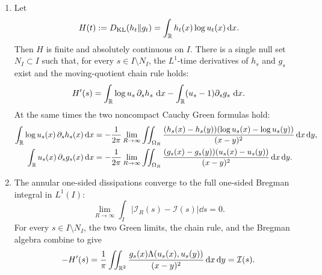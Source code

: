 \begin{proposition}[Bounded Lipschitz quotient implies \(H'=-I\)]
\begin{enumerate}
\item Let
\[
H(t):=D_{\mathrm{KL}}(h_t\|g_t)
=\int_{\mathbb{R}}h_t(x)\log u_t(x)\,\mathrm{d} x .
\]
Then \(H\) is finite and absolutely continuous on \(I\).  There is a single
null set \(N_I\subset I\) such that, for every \(s\in I\setminus N_I\), the
\(L^1\)-time derivatives of \(h_s\) and \(g_s\) exist and the moving-quotient
chain rule holds:
\begin{equation}\label{eq:compact-window-chain-rule-single-null-set}
H'(s)=\int_{\mathbb{R}}\log u_s\,\partial_sh_s\,\,\mathrm{d} x
-\int_{\mathbb{R}}(u_s-1)\partial_sg_s\,\,\mathrm{d} x .
\end{equation}
At the same times the two noncompact Cauchy Green formulas hold:
\begin{align}
\int_{\mathbb{R}}\log u_s(x)\,\partial_sh_s(x)\,\mathrm{d} x
&=-\frac{1}{2\pi}\lim_{R\to\infty}
\iint_{\Omega_R}
\frac{(h_s(x)-h_s(y))(\log u_s(x)-\log u_s(y))}
{(x-y)^2}\,\mathrm{d} x\,\mathrm{d} y, \label{eq:compact-window-h-logu-green}\\
\int_{\mathbb{R}}u_s(x)\,\partial_sg_s(x)\,\mathrm{d} x
&=-\frac{1}{2\pi}\lim_{R\to\infty}
\iint_{\Omega_R}
\frac{(g_s(x)-g_s(y))(u_s(x)-u_s(y))}
{(x-y)^2}\,\mathrm{d} x\,\mathrm{d} y. \label{eq:compact-window-g-u-green}
\end{align}

\item The annular one-sided dissipations converge to the full one-sided
Bregman integral in \(L^1(I)\):
\begin{equation}\label{eq:compact-window-annular-l1-convergence}
\lim_{R\to\infty}\int_I
\left|\mathscr I_R(s)-\mathscr I(s)\right|\dd s=0.
\end{equation}
For every \(s\in I\setminus N_I\), the two Green limits, the chain rule, and
the Bregman algebra combine to give
\begin{equation}\label{eq:compact-window-bregman-derivative}
-H'(s)
=\frac1\pi\iint_{\mathbb{R}^2}
\frac{g_s(x)\Lambda(u_s(x),u_s(y))}{(x-y)^2}\,\mathrm{d} x\,\mathrm{d} y
=\mathcal{I}(s).
\end{equation}
\end{enumerate}
\end{proposition}

